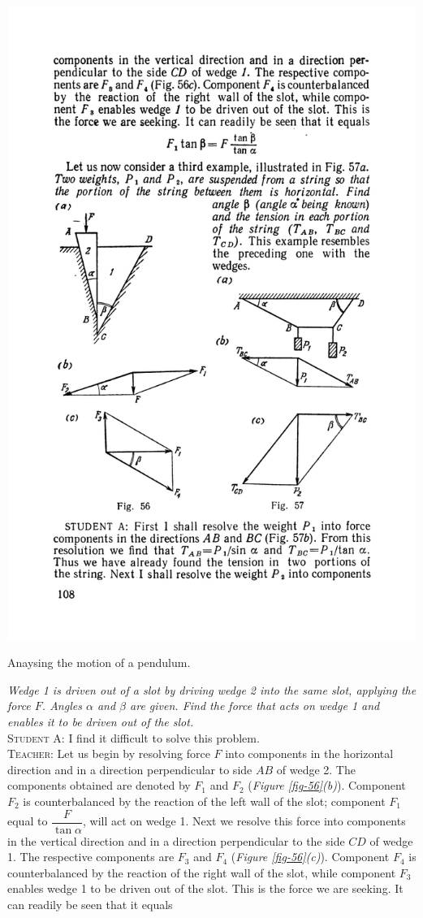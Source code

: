 \documentclass[a4paper,sfsidenotes]{tufte-book}
\begin{document}
\begin{marginfigure}
\centering
\includegraphics[width=\linewidth]{fig-056a.pdf}
\caption{Anaysing the motion of a pendulum.}
\label{fig-56}
\end{marginfigure}
\emph{Wedge 1 is driven out of a slot by driving wedge 2 into the same slot, applying the force $F$. Angles $\alpha$ and $\beta$ are given. Find the force that acts on wedge 1 and enables it to be driven out of the slot.}
\\
\textsc{Student A:} I find it difficult to solve this problem.
\\
\textsc{Teacher:} Let us begin by resolving force $F$ into components in the horizontal direction and in a direction perpendicular to side $AB$ of wedge 2. The components obtained are denoted by $F_{1}$ and $F_{2}$ (\emph{Figure \ref{fig-56}(b)}). Component $F_{2}$ is counterbalanced by the reaction of the left wall of the slot; component $F_{1}$  equal to $\dfrac{F}{\tan \alpha}$, will act on wedge 1. Next we resolve this force into components in the vertical direction and in a direction perpendicular to the side $CD$ of wedge 1. The respective components are $F_{3}$ and $F_{4}$ (\emph{Figure \ref{fig-56}(c)}). Component $F_{4}$ is counterbalanced by the reaction of the right wall of the slot, while component $F_{3}$ enables wedge 1 to be driven out of the slot. This is the force we are seeking. It can readily be seen that it equals
\end{document}
